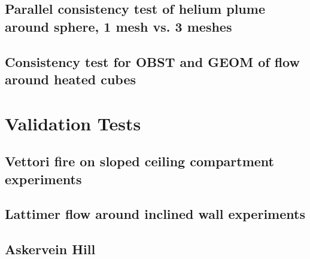 \documentclass[12pt]{article}
\begin{document}
\subsection{Parallel consistency test of helium plume around sphere, 1 mesh vs. 3 meshes}




\subsection{Consistency test for OBST and GEOM of flow around heated cubes}








\section{Validation Tests}

\subsection{Vettori fire on sloped ceiling compartment experiments}





\subsection{Lattimer flow around inclined wall experiments}





\subsection{Askervein Hill}
\end{document}
